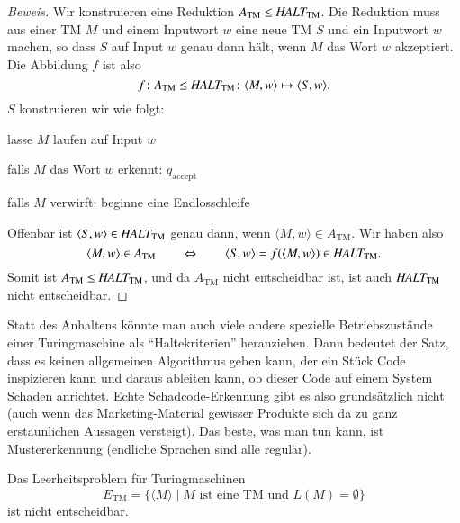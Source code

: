 \begin{proof}[Beweis]
Wir konstruieren eine Reduktion
$
A_{\text{TM}}
\le
\text{\it HALT}_{\text{TM}}
$.
Die Reduktion muss aus einer TM $M$ und einem Inputwort $w$ eine
neue TM $S$ und ein Inputwort $w$ machen, so dass $S$ auf
Input $w$ genau dann hält, wenn $M$ das Wort $w$ akzeptiert.
Die Abbildung $f$ ist also
\[
f\colon 
A_{\text{TM}}
\le
\text{\it HALT}_{\text{TM}}
\colon
\langle M,w\rangle\mapsto \langle S,w\rangle.
\]
$S$ konstruieren wir wie folgt:
\medskip
\begin{compactenum}
\item lasse $M$ laufen auf Input $w$
\item falls $M$ das Wort $w$ erkennt: $q_{\text{accept}}$
\item falls $M$ verwirft: beginne eine Endlosschleife
\end{compactenum}
\medskip
Offenbar ist
$\langle S,w\rangle\in \text{\it HALT}_{\text{TM}}$
genau dann, wenn $\langle M,w\rangle\in A_{\text{TM}}$.
Wir haben also
\[
\langle M,w\rangle\in A_{\text{TM}}
\qquad
\Leftrightarrow
\qquad
\langle S,w\rangle=f(\langle M,w\rangle)
\in \text{\it HALT}_{\text{TM}}.
\]
Somit ist 
$A_{\text{TM}}\le\text{\it HALT}_{\text{TM}}$, und da
$A_{\text{TM}}$ nicht entscheidbar ist, ist auch
$\text{\it HALT}_{\text{TM}}$ nicht entscheidbar.
\end{proof}
Statt des Anhaltens könnte man auch viele andere spezielle
Betriebszustände einer Turingmaschine als ``Haltekriterien''
heranziehen.
Dann bedeutet der Satz, dass es keinen allgemeinen
Algorithmus geben kann, der ein Stück Code inspizieren kann und
daraus ableiten kann, ob dieser Code auf einem System Schaden
anrichtet.
Echte Schadcode-Erkennung gibt es also grundsätzlich
nicht (auch wenn das Marketing-Material gewisser Produkte sich
da zu ganz erstaunlichen Aussagen versteigt).
Das beste, was man
tun kann, ist Mustererkennung (endliche Sprachen sind alle regulär).

\begin{satz}
%
Das Leerheitsproblem für Turingmaschinen
\[
E_{\text{TM}}
=
\{ \langle M\rangle\;|\; \text{$M$ ist eine TM und $L(M)=\emptyset$}\}
\]
%
ist nicht entscheidbar.
\end{satz}

